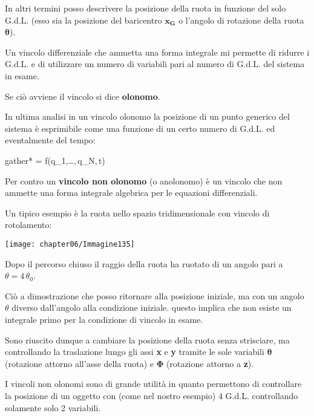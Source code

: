 \begin{itemize}
In altri termini posso descrivere la posizione della ruota in funzione del solo G.d.L. (esso sia la posizione del baricentro $\mathbf{x_G}$ o l'angolo di rotazione della ruota $\mathbf{\theta}$).
\end{itemize}

Un vincolo differenziale che ammetta una forma integrale mi permette di ridurre i G.d.L. e di utilizzare un numero di variabili pari al numero di G.d.L. del sistema in esame.

Se ciò avviene il vincolo si dice \textbf{olonomo}.

In ultima analisi in un vincolo olonomo la posizione di un punto generico del sistema è esprimibile come una funzione di un certo numero di G.d.L. ed eventalmente del tempo:
\begin{empheq}[box=%
	\fbox]{gather*}
		 = f(q_1,\dots,\,q_N,\,t)
	\end{empheq}
	
	Per contro un \textbf{vincolo non olonomo} (o anolonomo) è un vincolo che non ammette una forma integrale algebrica per le equazioni differenziali.
	
	Un tipico esempio è la ruota nello spazio tridimensionale con vincolo di rotolamento:
	\vspace{1mm}
	
	\begin{minipage}{.5\textwidth}
	\centering
\texttt{[image: chapter06/Immagine135]}
	\end{minipage}
	\hfill
	\begin{minipage}{.5\textwidth}
	Dopo il percorso chiuso il raggio della ruota ha ruotato di un angolo pari a $\theta = 4\,\theta_0$.\newline
	
	Ciò a dimostrazione che posso ritornare alla posizione iniziale, ma con un angolo $\theta$ diverso dall'angolo alla condizione iniziale. questo implica che non esiste un integrale primo per la condizione di vincolo in esame.\newline
	
	Sono riuscito dunque a cambiare la posizione della ruota senza strisciare, ma controllando la traslazione lungo gli assi \textbf{x} e \textbf{y} tramite le sole variabili $\mathbf{\theta}$ (rotazione attorno all'asse della ruota) e $\mathbf{\Phi}$ (rotazione attorno a \textbf{z}).
	\end{minipage}
	\vspace{1mm}
	
	I vincoli non olonomi sono di grande utilità in quanto permettono di controllare la posizione di un oggetto con (come nel nostro esempio) 4 G.d.L. controllando solamente solo 2 variabili.

